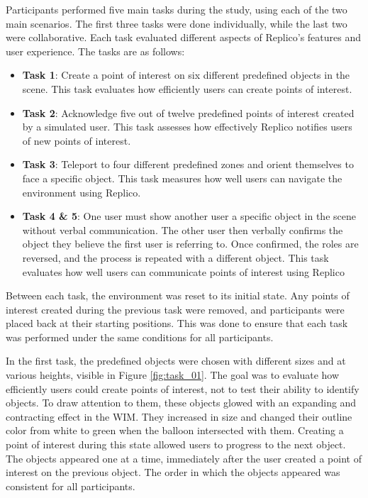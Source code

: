         Participants performed five main tasks during the study, using each of the two main scenarios. The first three tasks were done individually, while the last two were collaborative. Each task evaluated different aspects of Replico's features and user experience. The tasks are as follows:

        \begin{itemize}
            \item \textbf{Task 1}: Create a point of interest on six different predefined objects in the scene. This task evaluates how efficiently users can create points of interest.
            \item \textbf{Task 2}: Acknowledge five out of twelve predefined points of interest created by a simulated user. This task assesses how effectively Replico notifies users of new points of interest.
            \item \textbf{Task 3}: Teleport to four different predefined zones and orient themselves to face a specific object. This task measures how well users can navigate the environment using Replico.
            \item \textbf{Task 4 \& 5}: One user must show another user a specific object in the scene without verbal communication. The other user then verbally confirms the object they believe the first user is referring to. Once confirmed, the roles are reversed, and the process is repeated with a different object. This task evaluates how well users can communicate points of interest using Replico
        \end{itemize}

        Between each task, the environment was reset to its initial state. Any points of interest created during the previous task were removed, and participants were placed back at their starting positions. This was done to ensure that each task was performed under the same conditions for all participants.

        In the first task, the predefined objects were chosen with different sizes and at various heights, visible in Figure \ref{fig:task_01}. The goal was to evaluate how efficiently users could create points of interest, not to test their ability to identify objects. To draw attention to them, these objects glowed with an expanding and contracting effect in the WIM. They increased in size and changed their outline color from white to green when the balloon intersected with them. Creating a point of interest during this state allowed users to progress to the next object. The objects appeared one at a time, immediately after the user created a point of interest on the previous object. The order in which the objects appeared was consistent for all participants.

